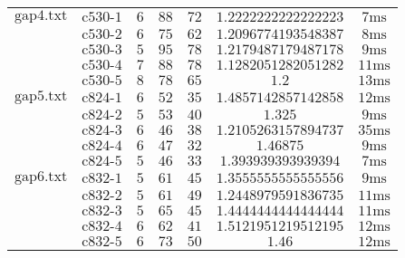 \begin{tabular}{ccccccc}
    $\text{gap4.txt}$ & $\text{c530-1}$ & $6$      & $88$          & $72$       & $1.2222222222222223$             & $\text{7ms}$   \\
     & $\text{c530-2}$ & $6$      & $75$          & $62$       & $1.2096774193548387$             & $\text{8ms}$   \\
     & $\text{c530-3}$ & $5$      & $95$          & $78$       & $1.2179487179487178$             & $\text{9ms}$   \\
     & $\text{c530-4}$ & $7$      & $88$          & $78$       & $1.1282051282051282$             & $\text{11ms}$  \\
     & $\text{c530-5}$ & $8$      & $78$          & $65$       & $1.2$                            & $\text{13ms}$  \\ \hline
    $\text{gap5.txt}$ & $\text{c824-1}$ & $6$      & $52$          & $35$       & $1.4857142857142858$             & $\text{12ms}$  \\
     & $\text{c824-2}$ & $5$      & $53$          & $40$       & $1.325$                          & $\text{9ms}$   \\
     & $\text{c824-3}$ & $6$      & $46$          & $38$       & $1.2105263157894737$             & $\text{35ms}$  \\
     & $\text{c824-4}$ & $6$      & $47$          & $32$       & $1.46875$                        & $\text{9ms}$   \\
     & $\text{c824-5}$ & $5$      & $46$          & $33$       & $1.393939393939394$              & $\text{7ms}$   \\ \hline
    $\text{gap6.txt}$ & $\text{c832-1}$ & $5$      & $61$          & $45$       & $1.3555555555555556$             & $\text{9ms}$   \\
     & $\text{c832-2}$ & $5$      & $61$          & $49$       & $1.2448979591836735$             & $\text{11ms}$  \\
     & $\text{c832-3}$ & $5$      & $65$          & $45$       & $1.4444444444444444$             & $\text{11ms}$  \\
     & $\text{c832-4}$ & $6$      & $62$          & $41$       & $1.5121951219512195$             & $\text{12ms}$  \\
     & $\text{c832-5}$ & $6$      & $73$          & $50$       & $1.46$                           & $\text{12ms}$  \\
\end{tabular}

